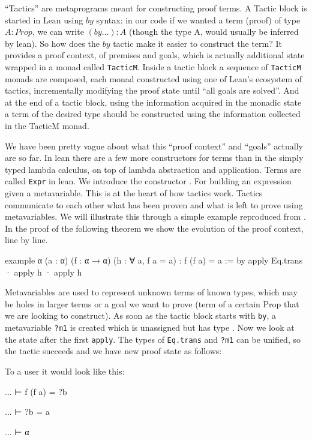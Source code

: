 ``Tactics'' are metaprograms meant for constructing proof terms. A Tactic block is started in Lean using $by$ syntax: in our code if we wanted
a term (proof) of type $A : Prop$, we can write $(by \ldots) : A$ (though the type A, would usually be inferred by lean). So how does the $by$ tactic
make it easier to construct the term? It provides a proof context, of premises and goals, which is actually additional state wrapped in a monad called
\texttt{TacticM}. Inside a tactic block a sequence of \texttt{TacticM} monads are composed, each monad constructed using one of Lean's ecosystem of tactics,
incrementally modifying the proof state until ``all goals are solved''. And at the end of a tactic block, using the information acquired in the monadic state
a term of the desired type should be constructed using the information collected in the TacticM monad.

We have been pretty vague about what this ``proof context'' and ``goals'' actually are so far. In lean there are a few more constructors for terms than in the simply
typed lambda calculus, on top of lambda abstraction and application. Terms are called \texttt{Expr} in lean. We introduce the constructor .
For building an expression given a metavariable. This is at the heart of how tactics work. Tactics communicate to each other what has been proven and
what is left to prove using metavariables. We will illustrate this through a simple example reproduced from \citep[chapter 4]{meta}. In the proof of the following
theorem we show the evolution of the proof context, line by line.

\begin{leancode}
example {α} (a : α) (f : α → α) (h : ∀ a, f a = a) : f (f a) = a := by
  apply Eq.trans
  · apply h
  · apply h
\end{leancode}

Metavariables are used to represent unknown terms of known types, which may be holes in larger terms or a goal we want to prove (term of a certain Prop that
we are looking to construct). As soon as the tactic block starts with \texttt{by}, a metavariable \texttt{?m1} is created which is unassigned but has type .
Now we look at the state after the first \texttt{apply}. The types of \texttt{Eq.trans} and \texttt{?m1} can be unified, so the tactic succeeds and we have new proof
state as follows:

To a user it would look like this:
\begin{leancode}
...
⊢ f (f a) = ?b

...
⊢ ?b = a

...
⊢ α
\end{leancode}

